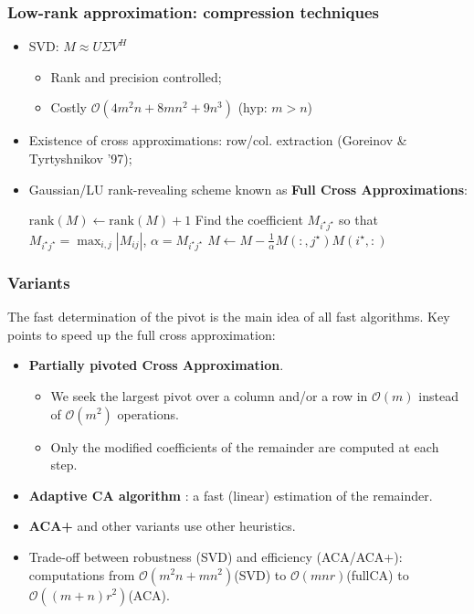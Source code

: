 \begin{frame}
\frametitle{Low-rank approximation: compression techniques}
\begin{itemize}
\item SVD: $M \approx U \Sigma V^H$
\begin{itemize}
\item Rank and precision controlled;
\item {\color{red}Costly $\mathcal{O}(4m^2n+8mn^2+9n^3)$} (hyp: $m>n$)
\end{itemize}
\item Existence of cross approximations: row/col. extraction (Goreinov \& Tyrtyshnikov '97);
\item Gaussian/LU rank-revealing scheme known as \textbf{Full Cross Approximations}:
\begin{algorithm}[H]
\begin{algorithmic}[1]
    \STATE $\mathrm{rank}(M) \leftarrow \mathrm{rank}(M) + 1$
    \STATE Find the coefficient $M_{i^{\star}j^{\star}}$ so that $M_{i^{\star}j^{\star}}=\max_{i,j}|M_{ij}|$, $\alpha = M_{i^{\star}j^{\star}}$
    \STATE $M \leftarrow M-\frac{1}{\alpha}M(:,j^{\star})M(i^{\star},:)$
\ENDWHILE
\end{algorithmic}
\end{algorithm}
\end{itemize}
\end{frame}

\begin{frame}
\frametitle{Variants} 
The fast determination of the pivot is
the main idea of all fast algorithms. Key points to speed up the full cross approximation:
\begin{itemize}
\item \textbf{Partially pivoted Cross Approximation}.
\begin{itemize}
\item We seek the largest pivot over a column and/or a row in $\mathcal{O}(m)$ instead of $\mathcal{O}(m^2)$ operations. 
\item Only the modified coefficients of the remainder are computed at each step.
\end{itemize}

\item \textbf{Adaptive CA algorithm} : a fast (linear) estimation of the remainder.
\item \textbf{ACA+} and other variants use other heuristics.
\item Trade-off between robustness (SVD) and efficiency (ACA/ACA+): computations from {\color{red}$\mathcal{O}(m^2n+mn^2)$}(SVD) to {\color{red}$\mathcal{O}(mnr)$}(fullCA) to {\color{red}$\mathcal{O}((m+n)r^2)$}(ACA).
\end{itemize}
\end{frame}

